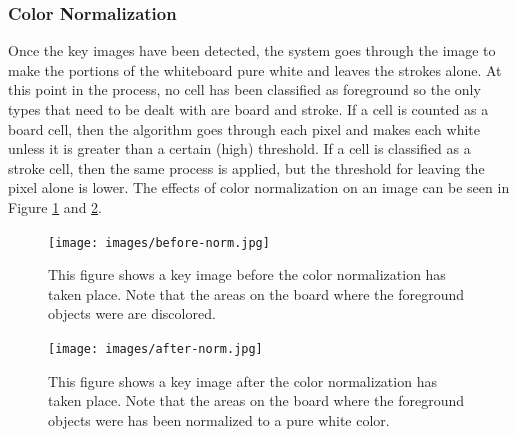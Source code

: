 \documentclass[]{article}
\begin{document}
			\subsubsection{Color Normalization}
				Once the key images have been detected, the system goes through the image to make the portions of the whiteboard pure white and leaves the strokes alone. At this point in the process, no cell has been classified as foreground so the only types that need to be dealt with are board and stroke. If a cell is counted as a board cell, then the algorithm goes through each pixel and makes each white unless it is greater than a certain (high) threshold. If a cell is classified as a stroke cell, then the same process is applied, but the threshold for leaving the pixel alone is lower. The effects of color normalization on an image can be seen in Figure \ref{img:before-norm} and \ref{img:after-norm}.
				
				\begin{figure}[h]
					\centering
					\texttt{[image: images/before-norm.jpg]}
					\caption{This figure shows a key image before the color normalization has taken place. Note that the areas on the board where the foreground objects were are discolored.}		
					\label{img:before-norm}
				\end{figure}
						
				
				\begin{figure}[h]
					\centering
					\texttt{[image: images/after-norm.jpg]}
					\caption{This figure shows a key image after the color normalization has taken place. Note that the areas on the board where the foreground objects were has been normalized to a pure white color.}
					\label{img:after-norm}
				\end{figure}
				
\end{document}

